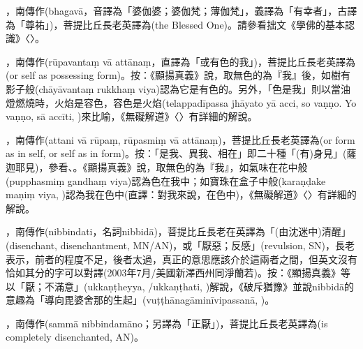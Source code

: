 \startitemgroup[noteitems]
\item{}，南傳作(bhagavā，音譯為「婆伽婆；婆伽梵；薄伽梵」，義譯為「有幸者」，古譯為「尊祐」)，菩提比丘長老英譯為(the Blessed One)。請參看拙文《學佛的基本認識》〈〉。
\stopitemgroup

\startitemgroup[noteitems]
\item{}，南傳作(rūpavantaṃ vā attānaṃ，直譯為「或有色的我」)，菩提比丘長老英譯為(or self as possessing form)。按：《顯揚真義》說，取無色的為『我』後，如樹有影子般(chāyāvantaṃ rukkhaṃ viya)認為它是有色的。另外，「色是我」則以當油燈燃燒時，火焰是容色，容色是火焰(telappadīpassa jhāyato yā acci, so vaṇṇo. Yo vaṇṇo, sā accīti, )來比喻，《無礙解道》〈〉有詳細的解說。
\stopitemgroup

\startitemgroup[noteitems]
\item{}，南傳作(attani vā rūpaṃ, rūpasmiṃ vā attānaṃ)，菩提比丘長老英譯為(or form as in self, or self as in form)。按：「是我、異我、相在」即二十種「(有)身見」(薩迦耶見)，參看、。《顯揚真義》說，取無色的為『我』，如氣味在花中般(pupphasmiṃ gandhaṃ viya)認為色在我中；如寶珠在盒子中般(karaṇḍake maṇiṃ viya, )認為我在色中(直譯：對我來說，在色中)，《無礙解道》〈〉有詳細的解說。
\stopitemgroup

\startitemgroup[noteitems]
\item{}，南傳作(nibbindati，名詞nibbidā)，菩提比丘長老在英譯為「(由沈迷中)清醒」(disenchant, disenchantment, MN/AN)，或「厭惡；反感」(revulsion, SN)，長老表示，前者的程度不足，後者太過，真正的意思應該介於這兩者之間，但英文沒有恰如其分的字可以對譯(2003年7月/美國新澤西州同淨蘭若)。按：《顯揚真義》等以「厭；不滿意」(ukkaṇṭheyya, /ukkaṇṭhati, )解說，《破斥猶豫》並說nibbidā的意趣為「導向毘婆舍那的生起」(vuṭṭhānagāminīvipassanā, )。
\item{}，南傳作(sammā nibbindamāno；另譯為「正厭」)，菩提比丘長老英譯為(is completely disenchanted, AN)。
\stopitemgroup

